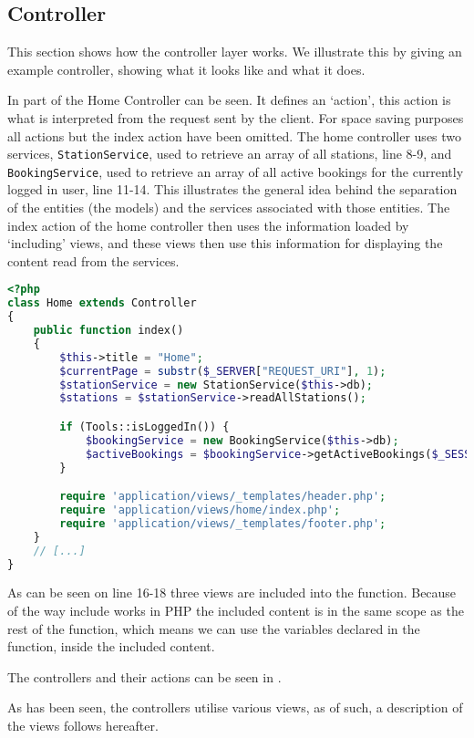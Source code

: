 \subsection{Controller}
This section shows how the controller layer works. 
We illustrate this by giving an example controller, showing what it looks like and what it does.

In  part of the Home Controller can be seen. 
It defines an `action', this action is what is interpreted from the request sent by the client. 
For space saving purposes all actions but the index action have been omitted.
The home controller uses two services, \texttt{StationService}, used to retrieve an array of all stations, line 8-9, and \texttt{BookingService}, used to retrieve an array of all active bookings for the currently logged in user, line 11-14. 
This illustrates the general idea behind the separation of the entities (the models) and the services associated with those entities.
The index action of the home controller then uses the information loaded by `including' views, and these views then use this information for displaying the content read from the services.

\begin{lstlisting}[language=php, label=lst:homeController, caption={Home Controller Class.}]
<?php
class Home extends Controller
{
    public function index()
    {
        $this->title = "Home";
        $currentPage = substr($_SERVER["REQUEST_URI"], 1);
        $stationService = new StationService($this->db);
        $stations = $stationService->readAllStations();

        if (Tools::isLoggedIn()) {
            $bookingService = new BookingService($this->db);
            $activeBookings = $bookingService->getActiveBookings($_SESSION["login_user"]);
        }

        require 'application/views/_templates/header.php';
        require 'application/views/home/index.php';
        require 'application/views/_templates/footer.php';
    }
    // [...]
}
\end{lstlisting}

As can be seen on line 16-18 three views are included into the function. Because of the way include works in PHP the included content is in the same scope as the rest of the function, which means we can use the variables declared in the function, inside the included content.

The controllers and their actions can be seen in .

As has been seen, the controllers utilise various views, as of such, a description of the views follows hereafter.